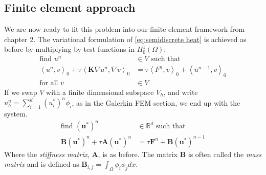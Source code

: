\documentclass[../Main/main.tex]{subfiles}
\begin{document}
	\subsection*{Finite element approach}
	We are now ready to fit this problem into our finite element framework from chapter 2.
	The variational formulation of \eqref{eq:semidiscrete heat} is achieved as before by multiplying by test functions in $H^1_0(\Omega)$:
	\begin{equation}
		\begin{aligned}
			\text{find }u^n&\in V \text{ such that }\\
			\left \langle  u^n, v\right \rangle_0 + \tau \left \langle  \pmb{K} \nabla u^n, \nabla v \right \rangle_0 &=\tau \left \langle F^n,v\right \rangle_0 + \left \langle u^{n-1},v \right \rangle_0\\
			\text{for all }v&\in V
		\end{aligned}
	\end{equation}
	If we swap $V$ with  a finite dimensional subspace $V_h$, and write $u_h^n = \sum_{i = 1}^d (u_i^*)^n \phi_i $, as in the Galerkin FEM section, we end up with the system.
	\begin{equation}\label{eq:heat fem disc}
		\begin{aligned}
			\text{find }(\pmb{u}^*)^n&\in \mathbb{R}^d \text{ such that }\\
			\pmb{B}(\pmb{u}^*)^n+\tau\pmb{A}(\pmb{u}^*)^n &=\tau \pmb{F}^n +  \pmb{B}(\pmb{u}^*)^{n-1}
		\end{aligned}
	\end{equation}
	Where the \emph{stiffness matrix}, $\pmb{A}$, is as before. The matrix $\pmb{B}$ is often called the \emph{mass matrix} and is defined as $\pmb{B}_{i,j} = \int_{\Omega} \phi_i \phi_jdx$.
\end{document}
